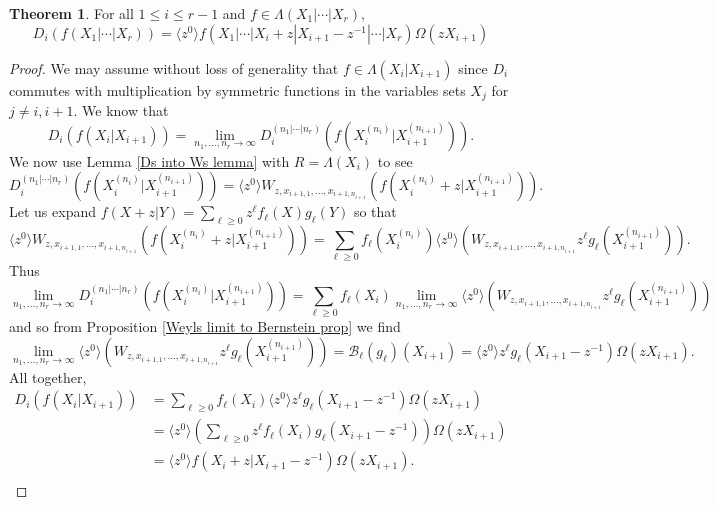\documentclass[12pt,reqno]{amsart}
\theoremstyle{definition}
\newtheorem{thm}{Theorem}[section]
\begin{document}
\begin{thm}\label{plethysm thm}
For all $1\leq i \leq r-1$ and $f \in \Lambda(X_1|\cdots|X_r),$
    $$D_i(f(X_1|\cdots|X_r))= \langle z^0 \rangle f(X_1|\cdots | X_i+z|X_{i+1}-z^{-1}|\cdots |X_r) \Omega(zX_{i+1})$$
\end{thm}
\begin{proof}
    We may assume without loss of generality that $f \in \Lambda(X_i|X_{i+1})$ since $D_i$ commutes with multiplication by symmetric functions in the variables sets $X_j$ for $j \neq i,i+1.$ We know that 
    $$D_i(f(X_i|X_{i+1})) = \lim_{n_1,\ldots,n_r \rightarrow \infty} D_i^{(n_1|\cdots|n_r)}(f(X_{i}^{(n_i)}|X_{i+1}^{(n_{i+1})})).$$ We now use Lemma \ref{Ds into Ws lemma} with $R = \Lambda(X_i)$ to see 
    $$D_i^{(n_1|\cdots|n_r)}(f(X_{i}^{(n_i)}|X_{i+1}^{(n_{i+1})})) = \langle z^0\rangle W_{z,x_{i+1,1},\ldots,x_{i+1,n_{i+1}}}(f( X_i^{(n_i)}+z | X_{i+1}^{(n_{i+1})})).$$ Let us expand $f(X+z|Y) = \sum_{\ell \geq 0} z^{\ell} f_{\ell}(X)g_{\ell}(Y)$ so that 
    $$\langle z^0\rangle W_{z,x_{i+1,1},\ldots,x_{i+1,n_{i+1}}}(f( X_i^{(n_i)}+z | X_{i+1}^{(n_{i+1})})) = \sum_{\ell \geq 0} f_{\ell}(X_i^{(n_i)}) \langle z^0\rangle \left(W_{z,x_{i+1,1},\ldots,x_{i+1,n_{i+1}}} z^{\ell}g_{\ell}(X_{i+1}^{(n_{i+1})}) \right).$$ Thus 
    $$\lim_{n_1,\ldots,n_r \rightarrow \infty} D_i^{(n_1|\cdots|n_r)}(f(X_{i}^{(n_i)}|X_{i+1}^{(n_{i+1})})) = \sum_{\ell \geq 0} f_{\ell}(X_i) \lim_{n_1,\ldots,n_r \rightarrow \infty} \langle z^0\rangle \left(W_{z,x_{i+1,1},\ldots,x_{i+1,n_{i+1}}} z^{\ell}g_{\ell}(X_{i+1}^{(n_{i+1})}) \right)$$ and so from Proposition \ref{Weyls limit to Bernstein prop} we find 
    $$\lim_{n_1,\ldots,n_r \rightarrow \infty} \langle z^0\rangle \left(W_{z,x_{i+1,1},\ldots,x_{i+1,n_{i+1}}} z^{\ell}g_{\ell}(X_{i+1}^{(n_{i+1})}) \right) = \mathcal{B}_{\ell}(g_{\ell})(X_{i+1})= \langle z^0 \rangle z^{\ell} g_{\ell}(X_{i+1}-z^{-1})\Omega(zX_{i+1}).$$ All together, 
    \begin{align*}
        D_i(f(X_i|X_{i+1})) &= \sum_{\ell \geq 0} f_{\ell}(X_i)\langle z^0 \rangle z^{\ell} g_{\ell}(X_{i+1}-z^{-1})\Omega(zX_{i+1})\\
        &= \langle z^0 \rangle \left( \sum_{\ell \geq 0} z^{\ell}f_{\ell}(X_i) g_{\ell}(X_{i+1}-z^{-1}) \right)\Omega(zX_{i+1})\\
        &= \langle z^0 \rangle f(X_{i}+z|X_{i+1}-z^{-1}) \Omega(zX_{i+1}).\\
    \end{align*}
   
    
\end{proof}
\end{document}
